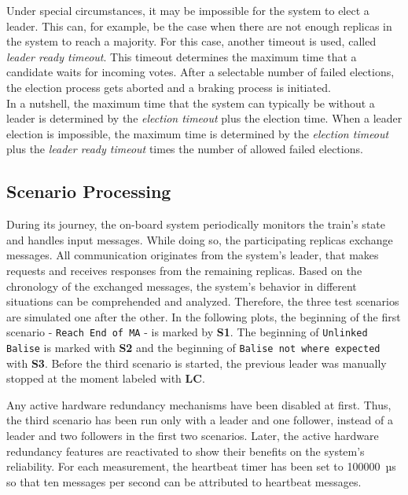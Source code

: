 Under special circumstances, it may be impossible for the system to elect a leader.
This can, for example, be the case when there are not enough replicas in the system to reach a majority.
For this case, another timeout is used, called \textit{leader ready timeout}.
This timeout determines the maximum time that a candidate waits for incoming votes.
After a selectable number of failed elections, the election process gets aborted and a braking process is initiated.
\\

In a nutshell, the maximum time that the system can typically be without a leader is determined by the \textit{election timeout} plus the election time.
When a leader election is impossible, the maximum time is determined by the \textit{election timeout} plus the \textit{leader ready timeout} times the number of allowed failed elections.

\subsection{Scenario Processing}

During its journey, the on-board system periodically monitors the train's state and handles input messages.
While doing so, the participating replicas exchange messages.
All communication originates from the system's leader, that makes requests and receives responses from the remaining replicas.
Based on the chronology of the exchanged messages, the system's behavior in different situations can be comprehended and analyzed.
Therefore, the three test scenarios are simulated one after the other.
In the following plots, the beginning of the first scenario - \texttt{Reach End of MA} - is marked by \textbf{S1}.
The beginning of \texttt{Unlinked Balise} is marked with \textbf{S2} and the beginning of \texttt{Balise not where expected} with \textbf{S3}.
Before the third scenario is started, the previous leader was manually stopped at the moment labeled with \textbf{LC}.

Any active hardware redundancy mechanisms have been disabled at first.
Thus, the third scenario has been run only with a leader and one follower, instead of a leader and two followers in the first two scenarios.
Later, the active hardware redundancy features are reactivated to show their benefits on the system's reliability.
For each measurement, the heartbeat timer has been set to 100000~µs so that ten messages per second can be attributed to heartbeat messages.
\\

